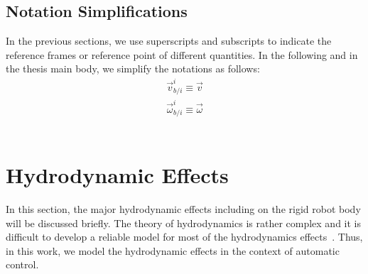 \subsection{Notation Simplifications}
In the previous sections, we use superscripts and subscripts to indicate the reference frames or reference point of different quantities. In the following and in the thesis main body, we simplify the notations as follows:
\begin{align}
\vec{v}^{i}_{b/i} \equiv \vec{v} \\
\vec{\omega}^{i}_{b/i} \equiv \vec{\omega} 
\end{align} \
\section{Hydrodynamic Effects}
In this section, the major hydrodynamic effects including on the rigid robot body will be discussed briefly. The theory of hydrodynamics is rather complex and it is 
difficult to develop a reliable model for most of the hydrodynamics effects~\cite{AG2014}. Thus, in this work, we model the hydrodynamic effects in the context of automatic control.
